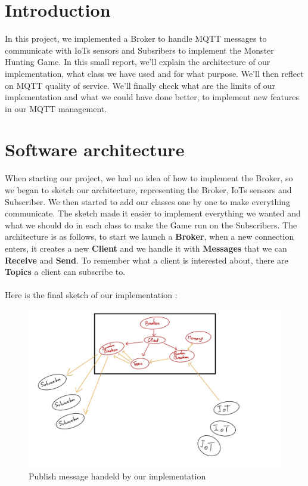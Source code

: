 \documentclass[12pt]{article}
\begin{document}
\thispagestyle{empty}
\tableofcontents
\pagebreak
\setcounter{page}{1}

\section{Introduction}
In this project, we implemented a Broker to handle MQTT messages to communicate with IoTs sensors 
and Subsribers to implement the Monster Hunting Game. In this small report, we'll explain the architecture of our implementation, 
what class we have used and for what purpose. We'll then reflect on MQTT quality of service. We'll finally check what are the limits of our implementation and what we could have done better, 
to implement new features in our MQTT management.

\section{Software architecture}
When starting our project, we had no idea of how to implement the Broker, so we began to sketch our architecture, representing the Broker, IoTs sensors and Subscriber. 
We then started to add our classes one by one to make everything communicate. The sketch made it easier to implement everything we wanted and what we should do in each class to make the Game run on the Subscribers. 
The architecture is as follows, to start we launch a \textbf{Broker}, when a new connection enters, it creates a new \textbf{Client} and we handle it 
with \textbf{Messages} that we can \textbf{Receive} and \textbf{Send}. To remember what a client is interested about, there are \textbf{Topics} a client 
can subscribe to.
\paragraph{}
Here is the final sketch of our implementation : 

\begin{figure}[!h]
	\centering
	\includegraphics[scale = 0.23]{PublishMessage.jpg}
	\caption{Publish message handeld by our implementation}
\end{figure}
\end{document}
